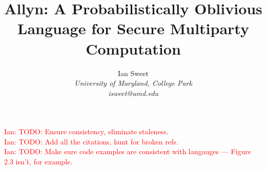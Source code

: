 \documentclass{report}
\newcommand{\lang}{Allyn\xspace}
\newcommand{\ins}[1]{\textcolor{red}{Ian: #1}}
\begin{document}
\title{\lang: A Probabilistically Oblivious Language for Secure Multiparty Computation}

\author{Ian Sweet \\
  \emph{University of Maryland, College Park} \\
  \emph{isweet@umd.edu}}

\date{}

\maketitle

\begin{abstract}  \end{abstract}

\ins{TODO: Ensure consistency, eliminate staleness.} \\
\ins{TODO: Add all the citations, hunt for broken refs.} \\
\ins{TODO: Make sure code examples are consistent with langauges --- Figure 2.3 isn't, for example.}

\tableofcontents










\appendix



\end{document}

